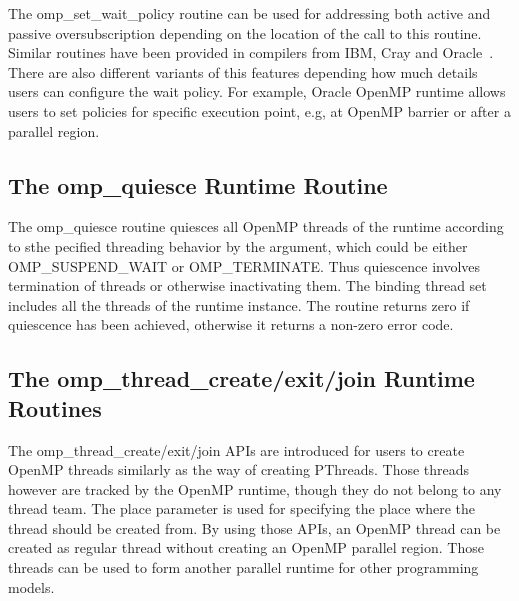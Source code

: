 The {\sf omp\_set\_wait\_policy} routine can be used for addressing both active and passive oversubscription depending on
the location of the call to this routine. Similar routines have been provided in compilers from IBM, Cray and 
Oracle~\cite{ibmwait,craywait,oraclewait}.
There are also different variants of this features depending how much details users can configure
the wait policy. For example, Oracle OpenMP runtime allows users to set policies for specific execution point, e.g, at OpenMP 
barrier or after a {\sf parallel} region. 

\subsection{The {\sf omp\_quiesce} Runtime Routine}
The {\sf omp\_quiesce} routine quiesces all OpenMP threads of the runtime according to 
sthe pecified threading behavior by the argument, which could be either {\sf OMP\_SUSPEND\_WAIT} or {\sf OMP\_TERMINATE}. 
Thus quiescence involves termination of threads or otherwise inactivating them. 
The binding thread set includes all the threads of the runtime instance. 
The routine returns zero if quiescence has been achieved, otherwise it returns a non-zero error code.



\subsection{The {\sf omp\_thread\_create/exit/join} Runtime Routines}

The {\sf omp\_thread\_create/exit/join} APIs are introduced for users to create OpenMP threads similarly as the way of creating
PThreads. Those threads however are tracked by the OpenMP runtime, though they do not belong to any thread team. 
The {\sf place} parameter is used for specifying the place where the thread should be created from.  
By using those APIs, an OpenMP thread can be created as regular thread without creating an OpenMP {\sf parallel} region. 
Those threads can be used to form another parallel runtime for other programming
models. 



